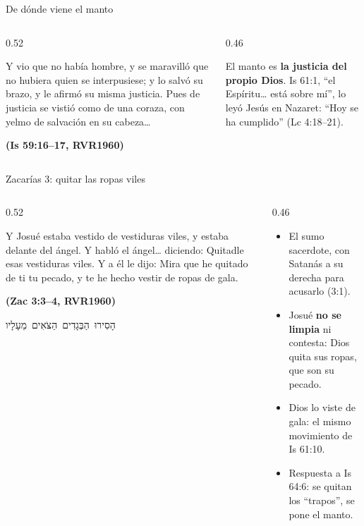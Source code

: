 \documentclass[hyperref={bookmarks=false},aspectratio=169]{beamer}
\newcommand{\heb}[1]{\mbox{\foreignlanguage{hebrew}{#1}}}
\newcommand{\fuente}[1]{\par\hfill{\upshape\bfseries\footnotesize\textcolor{azul}{#1}}}
\newcommand{\destacar}[1]{\textbf{\textcolor{azul}{#1}}}
\begin{document}
\begin{frame}{De dónde viene el manto}
\begin{columns}[c,onlytextwidth]
\begin{column}{0.52\textwidth}
\begin{cita}Y vio que no había hombre, y se maravilló que no hubiera quien se interpusiese; y lo salvó su brazo, y le afirmó su misma justicia. Pues de justicia se vistió como de una coraza, con yelmo de salvación en su cabeza\ldots\fuente{(Is 59:16--17, RVR1960)}\end{cita}
\end{column}
\begin{column}{0.46\textwidth}
\centering
{}\par\medskip
\small El manto es \destacar{la justicia del propio Dios}. Is 61:1, ``el Espíritu\ldots{} está sobre mí'', lo leyó Jesús en Nazaret: ``Hoy se ha cumplido'' (Lc 4:18--21).
\end{column}
\end{columns}
\end{frame}

\begin{frame}{Zacarías 3: quitar las ropas viles}
\begin{columns}[c,onlytextwidth]
\begin{column}{0.52\textwidth}
\begin{cita}Y Josué estaba vestido de vestiduras viles, y estaba delante del ángel. Y habló el ángel\ldots{} diciendo: Quitadle esas vestiduras viles. Y a él le dijo: Mira que he quitado de ti tu pecado, y te he hecho vestir de ropas de gala.\fuente{(Zac 3:3--4, RVR1960)}\end{cita}
\begin{center}\small\heb{הָסִירוּ הַבְּגָדִים הַצֹּאִים מֵעָלָיו}\end{center}
\end{column}
\begin{column}{0.46\textwidth}\small
\begin{itemize}
\item El sumo sacerdote, con Satanás a su derecha para acusarlo (3:1).
\item Josué \destacar{no se limpia} ni contesta: Dios quita sus ropas, que son su pecado.
\item Dios lo viste de gala: el mismo movimiento de Is 61:10.
\item Respuesta a Is 64:6: se quitan los ``trapos'', se pone el manto.
\end{itemize}
\end{column}
\end{columns}
\end{frame}
\end{document}
